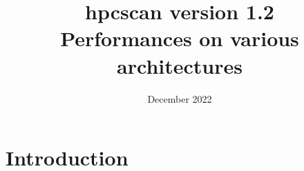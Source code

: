 \documentclass[usenames,dvipsnames]{beamer}
\title[hpcscan benchmarks]{hpcscan version 1.2 \\ Performances on various architectures}
\date[December 2022] {\small{December 2022}}
\begin{document}
\scriptsize

\maketitle 

\clearpage



\section{Introduction}

\end{document}
